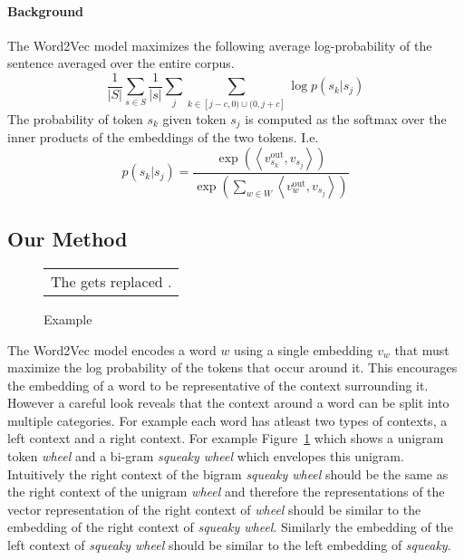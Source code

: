 \documentclass{article}
\newcommand{\figref}[1]{Figure~\ref{#1}}
\newcommand{\vo}[1]{v^{\textrm{out}}_{#1}}
\newcommand{\ip}[2]{\left\langle#1, #2\right\rangle}
\newcommand{\wv}{Word2Vec\xspace}
\begin{document}
\paragraph{Background} The \wv model maximizes the following average log-probability of the
sentence averaged over the entire corpus.
\begin{equation}
  \label{eq:w2vec1}
  \frac{1}{|S|} \sum_{s \in S} \frac{1}{|s|} \sum_{j} \sum_{k \in [j-c,0) \cup (0,j+c]} \log p(s_k | s_j)
\end{equation}
\noindent The probability of token $s_k$ given token $s_j$ is computed as the
softmax over the inner products of the embeddings of the two tokens. I.e.
\begin{equation}
  \label{eq:w2vec2}
  p(s_k | s_j) = \frac{\exp\left(\ip{\vo{s_k}}{v_{s_j}}\right)}{\exp\left(\sum_{w \in W}\ip{\vo{w}}{v_{s_j}}\right)}
\end{equation}

\subsection{Our Method}
\label{ssec:our-method}
\begin{figure}[htbp]
  \centering
  \begin{tabular}{c}
      The \framebox{squeaky \framebox{wheel}} gets replaced .
  \end{tabular}
  \caption{Example}
  \label{fig:pretty-example}
\end{figure}
The \wv model encodes a word $w$ using a single embedding $v_w$ that must
maximize the log probability of the tokens that occur around it. This encourages
the embedding of a word to be representative of the context surrounding
it. However a careful look reveals that the context around a word can be split
into multiple categories. For example each word has atleast two types of
contexts, a left context and a right context.
For example \figref{fig:pretty-example} which shows a unigram token \textit{wheel}
and a bi-gram \textit{squeaky wheel} which envelopes this unigram. Intuitively the
right context of the bigram \textit{squeaky wheel} should be the same as the
right context of the unigram \textit{wheel} and therefore the representations
of the vector representation of the right context of \textit{wheel} should be
similar to the embedding of the right context of \textit{squeaky
  wheel}. Similarly the embedding of the left context of \textit{squeaky wheel} should be
similar to the left embedding of \textit{squeaky}.
\end{document}
